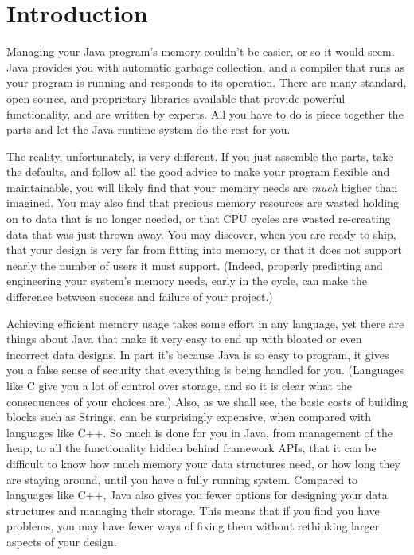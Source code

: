 
\chapter{Introduction}

Managing your Java program's memory couldn't be easier, or so it would
seem. Java provides you with automatic garbage collection, and a compiler that
runs as your program is running and responds to its operation. There are many
standard, open source, and proprietary libraries available that provide powerful
functionality, and are written by experts. All you have to do is piece together
the parts and let the Java runtime system do the rest for you.

The reality, unfortunately, is very different. If you just assemble the parts, take
the defaults, and follow all the good advice to make your
program flexible and maintainable, you will likely find that your memory needs are
\emph{much} higher than imagined. You may also find that precious memory
resources are wasted holding on to data that is no longer needed, or that
CPU cycles are wasted re-creating data that was just thrown away. 
You may discover, when you are ready to ship, that your design is very far from
fitting into memory, or that it does not support nearly the number of users it
must support. (Indeed, properly predicting and engineering 
your system's memory needs, early in the cycle, can make the
difference between success and failure of your project.)

Achieving efficient memory usage takes some effort in any language, yet
there are things about Java that make it very easy to end up with bloated or even incorrect
data designs. In part it's because Java is so easy to program, it gives you a
false sense of security that everything is being handled for you. (Languages like C give you a
lot of control over storage, and so it is clear what
the consequences of your choices are.) Also, as we shall see,
the basic costs of building blocks such as Strings, can be surprisingly expensive,
when compared with languages like C++. So much is done for you in
Java, from management of the heap, to all the functionality hidden behind framework APIs, that it can be
difficult to know how much memory your data structures need, or how long they are staying around, until you have
a fully running system. Compared to languages like C++, Java also gives you fewer options for designing your
data structures and managing their storage. This means that if you find you have problems, you may have fewer
ways of fixing them without rethinking larger aspects of your design.

